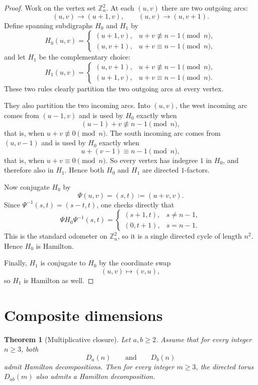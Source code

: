 \documentclass[11pt]{article}
\newtheorem{theorem}[proposition]{Theorem}
\newcommand{\torus}[2]{D_{#1}(#2)}
\begin{document}
\begin{proof}
Work on the vertex set $\mathbb Z_n^2$. At each $(u,v)$ there are two outgoing
arcs:
\[
(u,v)\to(u+1,v),
\qquad
(u,v)\to(u,v+1).
\]
Define spanning subdigraphs $H_0$ and $H_1$ by
\[
H_0(u,v)=
\begin{cases}
(u+1,v), & u+v \not\equiv n-1 \pmod n,\\
(u,v+1), & u+v \equiv n-1 \pmod n,
\end{cases}
\]
and let $H_1$ be the complementary choice:
\[
H_1(u,v)=
\begin{cases}
(u,v+1), & u+v \not\equiv n-1 \pmod n,\\
(u+1,v), & u+v \equiv n-1 \pmod n.
\end{cases}
\]
These two rules clearly partition the two outgoing arcs at every vertex.

They also partition the two incoming arcs. Into $(u,v)$, the west incoming arc
comes from $(u-1,v)$ and is used by $H_0$ exactly when
\[
(u-1)+v \not\equiv n-1 \pmod n,
\]
that is, when $u+v \not\equiv 0 \pmod n$. The south incoming arc comes from
$(u,v-1)$ and is used by $H_0$ exactly when
\[
u+(v-1) \equiv n-1 \pmod n,
\]
that is, when $u+v \equiv 0 \pmod n$. So every vertex has indegree $1$ in
$H_0$, and therefore also in $H_1$. Hence both $H_0$ and $H_1$ are directed
$1$-factors.

Now conjugate $H_0$ by
\[
\Psi(u,v)=(s,t):=(u+v,v).
\]
Since $\Psi^{-1}(s,t)=(s-t,t)$, one checks directly that
\[
\Psi H_0 \Psi^{-1}(s,t)=
\begin{cases}
(s+1,t), & s \neq n-1,\\
(0,t+1), & s=n-1.
\end{cases}
\]
This is the standard odometer on $\mathbb Z_n^2$, so it is a single directed
cycle of length $n^2$. Hence $H_0$ is Hamilton.

Finally, $H_1$ is conjugate to $H_0$ by the coordinate swap
\[
(u,v)\longmapsto(v,u),
\]
so $H_1$ is Hamilton as well.
\end{proof}

\section*{Composite dimensions}

\begin{theorem}[Multiplicative closure]
Let $a,b \ge 2$. Assume that for every integer $n \ge 3$, both
\[
\torus{a}{n}
\qquad\text{and}\qquad
\torus{b}{n}
\]
admit Hamilton decompositions. Then for every integer $m \ge 3$, the directed
torus $\torus{ab}{m}$ also admits a Hamilton decomposition.
\end{theorem}
\end{document}
